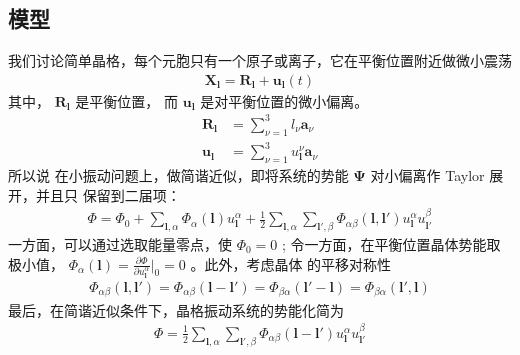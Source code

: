 \subsection{模型}
我们讨论简单晶格，每个元胞只有一个原子或离子，它在平衡位置附近做微小震荡
\begin{equation}
    \begin{aligned} 
    \mathbf{X}_\mathbf{l} =\mathbf{R_l}  + \mathbf{u_l}(t)  
    \end{aligned} 
\end{equation}
其中， $ \mathbf{R_l}   $ 是平衡位置， 而 $ \mathbf{u_l} $ 是对平衡位置的微小偏离。
\begin{equation}
    \begin{aligned} 
    \mathbf{R_l} &= \sum_{\nu = 1}^3 l_\nu \mathbf{a}_\nu \\
    \mathbf{u_l} &= \sum_{\nu = 1}^3 u_\mathbf{l}^\nu   \mathbf{a}_\nu 
    \end{aligned} 
\end{equation}
所以说
在小振动问题上，做简谐近似，即将系统的势能 $ \mathbf{\Psi}  $ 对小偏离作 Taylor 展开，并且只
保留到二届项：
\begin{equation}
    \begin{aligned} 
    \Phi = \Phi_0 + \sum_{\mathbf{l},\alpha }\Phi_\alpha (\mathbf{l}) u_\mathbf{l}^\alpha 
    + \frac{1}{2} \sum_{\mathbf{l},\alpha }\sum_{\mathbf{l'},\beta}\Phi_{\alpha \beta} 
    (\mathbf{l,l'} )u_\mathbf{l}^\alpha u_\mathbf{l'}^\beta 
    \end{aligned} 
\end{equation}
一方面，可以通过选取能量零点，使 $ \Phi_0 =0 $ ; 令一方面，在平衡位置晶体势能取极小值， $ \Phi_\alpha 
(\mathbf{l})  = \frac{\partial \Phi}{\partial u_\mathbf{l}^\alpha }|_0 = 0 $ 。此外，考虑晶体
的平移对称性
\begin{equation}
    \begin{aligned} 
    \Phi_{\alpha \beta} (\mathbf{l,l'} ) = \Phi_{\alpha \beta}(\mathbf{l - l'} ) = 
    \Phi_{\beta \alpha} (\mathbf{l' - l} ) = \Phi_{\beta \alpha}(\mathbf{l',l} )
    \end{aligned} 
\end{equation}
最后，在简谐近似条件下，晶格振动系统的势能化简为
\begin{equation}
    \begin{aligned} 
        \Phi = \frac{1}{2} \sum_{\mathbf{l},\alpha }\sum_{\mathbf{l'},\beta}\Phi_{\alpha \beta} 
        (\mathbf{l-l'} )u_\mathbf{l}^\alpha u_\mathbf{l'}^\beta 
    \end{aligned} 
\end{equation}
